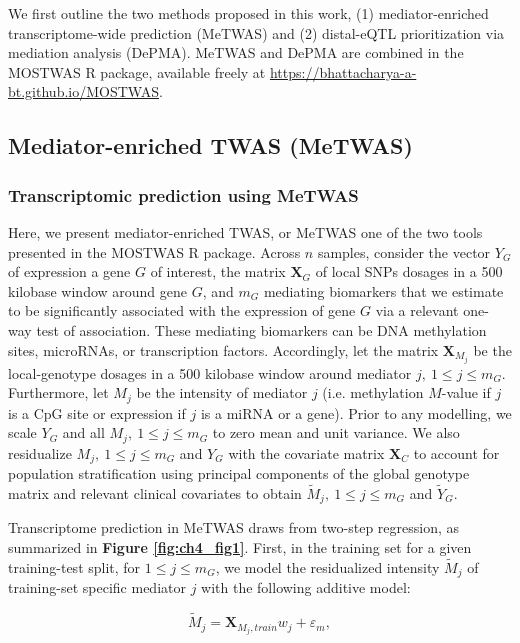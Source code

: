

We first outline the two methods
proposed in this work, (1) mediator-enriched transcriptome-wide
prediction (MeTWAS) and (2) distal-eQTL 
prioritization via mediation analysis (DePMA). 
MeTWAS and DePMA are combined
in the MOSTWAS R package,
available freely at \url{https://bhattacharya-a-bt.github.io/MOSTWAS}.

\subsection{Mediator-enriched TWAS (MeTWAS)}

\subsubsection{Transcriptomic prediction using MeTWAS}

Here, we present mediator-enriched TWAS, or MeTWAS
one of the two tools presented in the MOSTWAS R package.
Across $n$ samples, consider the vector $Y_G$ 
of expression a gene $G$ 
of interest, the matrix $\mathbf{X}_G$ 
of local SNPs dosages
in a 500 kilobase window around gene $G$, and 
$m_G$ mediating biomarkers that
we estimate to be significantly associated
with the expression of gene $G$ via a
relevant one-way test of association. These
mediating biomarkers can be DNA methylation sites,
microRNAs, or transcription factors. Accordingly,
let the matrix $\mathbf{X}_{M_j}$ be the 
local-genotype dosages in a 500 kilobase
window around mediator $j,~1 \leq j \leq m_G$. Furthermore,
let $M_j$ be the intensity of mediator $j$ 
(i.e. methylation $M$-value if $j$ is a CpG site or
expression if $j$ is a miRNA or a gene).
Prior to any modelling, we scale $Y_G$ and all 
$M_j,~1 \leq j \leq m_G$ to zero mean and
unit variance. We also residualize
$M_j,~1 \leq j \leq m_G$ and $Y_G$ 
with the covariate matrix $\mathbf{X}_C$
to account for population stratification using
principal components of the global genotype matrix
and relevant clinical covariates to obtain
$\tilde{M}_j,~1 \leq j \leq m_G$ and $\tilde{Y}_G$.

Transcriptome prediction in MeTWAS draws from
two-step regression, as summarized in \textbf{Figure \ref{fig:ch4_fig1}}.
First, in the training set
for a given training-test split,
for $1 \leq j \leq m_G$, we model the residualized 
intensity $\tilde{M}_j$ of training-set specific 
mediator $j$ with
the following additive model:

\begin{equation}
	\tilde{M}_j = \mathbf{X}_{M_j,train}w_j +
	\varepsilon_m,
\end{equation}

